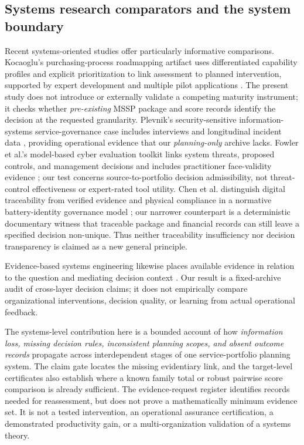\documentclass[systems,article,submit,moreauthors]{Definitions/mdpi}
\begin{document}
\subsection{Systems research comparators and the system boundary}
Recent systems-oriented studies offer particularly informative comparisons. Kocaoglu's purchasing-process roadmapping artifact uses differentiated capability profiles and explicit prioritization to link assessment to planned intervention, supported by expert development and multiple pilot applications \cite{Kocaoglu2026}. The present study does not introduce or externally validate a competing maturity instrument; it checks whether \emph{pre-existing} MSSP package and score records identify the decision at the requested granularity. Plevnik's security-sensitive information-systems service-governance case includes interviews and longitudinal incident data \cite{Plevnik2026}, providing operational evidence that our \emph{planning-only} archive lacks. Fowler et al.'s model-based cyber evaluation toolkit links system threats, proposed controls, and management decisions and includes practitioner face-validity evidence \cite{Fowler2024}; our test concerns source-to-portfolio decision admissibility, not threat-control effectiveness or expert-rated tool utility. Chen et al. distinguish digital traceability from verified evidence and physical compliance in a normative battery-identity governance model \cite{Chen2026}; our narrower counterpart is a deterministic documentary witness that traceable package and financial records can still leave a specified decision non-unique. Thus neither traceability insufficiency nor decision transparency is claimed as a new general principle.

Evidence-based systems engineering likewise places available evidence in relation to the question and mediating decision context \cite{Hybertson2018}. Our result is a fixed-archive audit of cross-layer decision claims; it does not empirically compare organizational interventions, decision quality, or learning from actual operational feedback.

The systems-level contribution here is a bounded account of how \emph{information loss, missing decision rules, inconsistent planning scopes, and absent outcome records} propagate across interdependent stages of one service-portfolio planning system. The claim gate locates the missing evidentiary link, and the target-level certificates also establish where a known family total or robust pairwise score comparison is already sufficient. The evidence-request register identifies records needed for reassessment, but does not prove a mathematically minimum evidence set. It is not a tested intervention, an operational assurance certification, a demonstrated productivity gain, or a multi-organization validation of a systems theory.
\end{document}
